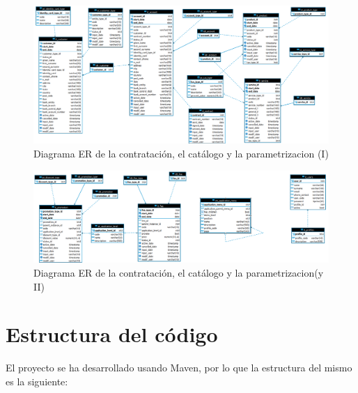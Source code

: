 \begin{landscape}

\begin{figure}[hp!]
  \centering
  \includegraphics[width=1\textwidth]{imaxes/er-instancia-01.png}          	  \caption{Diagrama ER de la contratación, el catálogo y la parametrizacion (I)}
  \label{fig:er-instancia-01}
\end{figure}

\begin{figure}[hp!]
  \centering
  \includegraphics[width=1\textwidth]{imaxes/er-instancia-02.png}
  \caption{Diagrama ER de la contratación, el catálogo y la parametrizacion(y II)}
  \label{fig:er-instancia-02}
\end{figure}


\end{landscape}


\section{Estructura del código}
\label{chap:estructuraCodigo}

El proyecto se ha desarrollado usando Maven, por lo que la estructura del mismo es la siguiente:


